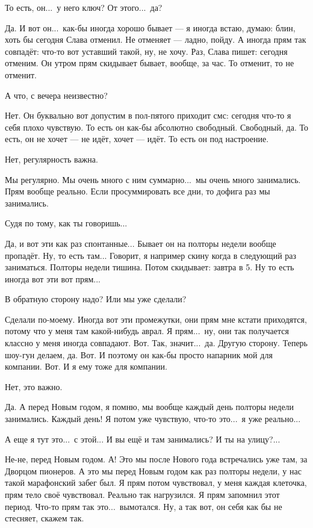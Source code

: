 \M
То есть, он...\ у него ключ? От этого...\ да?

\I
Да. И вот он...\ как-бы иногда хорошо бывает --- я иногда встаю, думаю:
блин, хоть бы сегодня Слава отменил. Не отменяет --- ладно, пойду.
А иногда прям так совпадёт: что-то вот уставший такой, ну, не хочу.
Раз, Слава пишет: сегодня отменим. Он утром прям скидывает бывает, вообще, за час.
То отменит,
то не отменит.

\M
А что, с вечера неизвестно?

\I
Нет. Он буквально вот допустим в пол-пятого приходит смс: сегодня что-то
я себя плохо чувствую.
То есть он как-бы абсолютно свободный.
Свободный, да.
То есть, он не хочет --- не идёт, хочет --- идёт.
То есть он под настроение.

\M
Нет, регулярность важна.

\I
Мы регулярно. Мы очень много с ним суммарно...\
мы очень много занимались. Прям вообще реально.
Если просуммировать все дни, то дофига раз мы занимались.

\M
Судя по тому, как ты говоришь...

\I
Да, и вот эти как раз спонтанные...
Бывает он на полторы недели вообще пропадёт.
Ну, то есть там...
Говорит, я например скину когда в следующий раз заниматься.
Полторы недели тишина.
Потом скидывает: завтра в 5.
Ну то есть иногда вот эти вот прям...

\M
В обратную сторону надо? Или мы уже сделали?

\I
Сделали по-моему. Иногда вот эти промежутки,
они прям мне кстати приходятся, потому что у меня там какой-нибудь аврал.
Я прям...\ ну, они так получается классно у меня
иногда совпадают. Вот. Так, значит...\ да. Другую сторону. Теперь шоу-гун делаем, да.
Вот. И поэтому он как-бы просто напарник мой для компании. Вот. И я ему тоже для компании.

\M
Нет, это важно.

\I
Да. А перед Новым годом, я помню, мы вообще каждый день полторы недели занимались.
Каждый день! Я потом уже чувствую, что-то это...\ я уже реально...

\M
А еще я тут это...\ с этой... И вы ещё и там занимались? И ты на улицу?...

\I
Не-не, перед Новым годом. А! Это мы после Нового года встречались уже там, за Дворцом пионеров.
А это мы перед Новым годом как раз полторы недели, у нас такой марафонский забег был.
Я прям потом чувствовал, у меня каждая клеточка, прям тело своё чувствовал.
Реально так нагрузился. Я прям запомнил этот период.
Что-то прям так это...\ вымотался. Ну, а так вот, он себя как бы не стесняет, скажем так.

